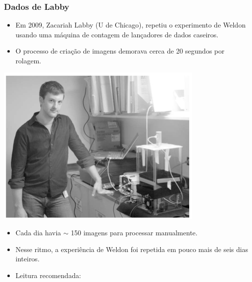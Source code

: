 \begin{frame}
\frametitle{Dados de Labby}
{
\begin{itemize}
\justifying
\item Em 2009, Zacariah Labby (U de Chicago), repetiu o experimento de Weldon usando uma máquina de contagem de lançadores de dados caseiros.
\begin{center}
\justifying
{}
\end{center}
\justifying
\item O processo de criação de imagens demorava cerca de 20 segundos por rolagem.

\end{itemize}
}
{
\begin{center}
\includegraphics[width=\textwidth]{6-3_chisq_gof/labby.png}
\end{center}
}

\begin{itemize}
\justifying
\item Cada dia havia $\sim$ 150 imagens para processar manualmente.
\justifying
\item Nesse ritmo, a experiência de Weldon foi repetida em pouco mais de seis dias inteiros.
\justifying
\item Leitura recomendada:

\end{itemize}

\end{frame}

